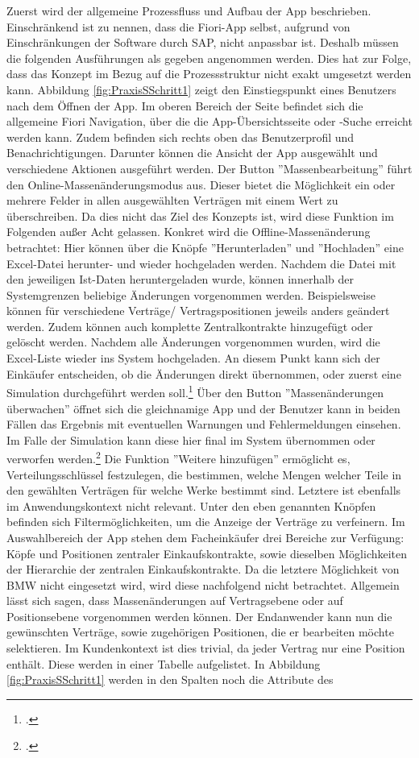Zuerst wird der allgemeine Prozessfluss und Aufbau der App beschrieben. Einschränkend ist zu nennen, dass die Fiori-App selbst, aufgrund von Einschränkungen der Software durch SAP, nicht anpassbar ist. Deshalb müssen die folgenden Ausführungen als gegeben angenommen werden. Dies hat zur Folge, dass das Konzept im Bezug auf die Prozessstruktur nicht exakt umgesetzt werden kann. Abbildung \ref{fig:PraxisSSchritt1} zeigt den Einstiegspunkt eines Benutzers nach dem Öffnen der App. Im oberen Bereich der Seite befindet sich die allgemeine Fiori Navigation, über die die App-Übersichtsseite oder -Suche erreicht werden kann. Zudem befinden sich rechts oben das Benutzerprofil und Benachrichtigungen. Darunter können die Ansicht der App ausgewählt und verschiedene Aktionen ausgeführt werden. Der Button ''Massenbearbeitung'' führt den Online-Massenänderungsmodus aus. Dieser bietet die Möglichkeit ein oder mehrere Felder in allen ausgewählten Verträgen mit einem Wert zu überschreiben. Da dies nicht das Ziel des Konzepts ist, wird diese Funktion im Folgenden au\ss er Acht gelassen. Konkret wird die Offline-Massenänderung betrachtet: Hier können über die Knöpfe ''Herunterladen'' und ''Hochladen'' eine Excel-Datei herunter- und wieder hochgeladen werden. Nachdem die Datei mit den jeweiligen Ist-Daten heruntergeladen wurde, können innerhalb der Systemgrenzen beliebige Änderungen vorgenommen werden. Beispielsweise können für verschiedene Verträge/ Vertragspositionen jeweils anders geändert werden. Zudem können auch komplette Zentralkontrakte hinzugefügt oder gelöscht werden. Nachdem alle Änderungen vorgenommen wurden, wird die Excel-Liste wieder ins System hochgeladen. An diesem Punkt kann sich der Einkäufer entscheiden, ob die Änderungen direkt übernommen, oder zuerst eine Simulation durchgeführt werden soll.\footcite[Vgl.][]{theorie_sap_fiori_make_mass_changes_2024} Über den Button ''Massenänderungen überwachen'' öffnet sich die gleichnamige App und der Benutzer kann in beiden Fällen das Ergebnis mit eventuellen Warnungen und Fehlermeldungen einsehen. Im Falle der Simulation kann diese hier final im System übernommen oder verworfen werden.\footcite[Vgl.][]{theorie_sap_fiori_monitor_mass_changes_2024} Die Funktion ''Weitere hinzufügen'' ermöglicht es, Verteilungsschlüssel festzulegen, die bestimmen, welche Mengen welcher Teile in den gewählten Verträgen für welche Werke bestimmt sind. Letztere ist ebenfalls im Anwendungskontext nicht relevant. Unter den eben genannten Knöpfen befinden sich Filtermöglichkeiten, um die Anzeige der Verträge zu verfeinern. Im Auswahlbereich der App stehen dem Facheinkäufer drei Bereiche zur Verfügung: Köpfe und Positionen zentraler Einkaufskontrakte, sowie dieselben Möglichkeiten der Hierarchie der zentralen Einkaufskontrakte. Da die letztere Möglichkeit von BMW nicht eingesetzt wird, wird diese nachfolgend nicht betrachtet. Allgemein lässt sich sagen, dass Massenänderungen auf Vertragsebene oder auf Positionsebene vorgenommen werden können. Der Endanwender kann nun die gewünschten Verträge, sowie zugehörigen Positionen, die er bearbeiten möchte selektieren. Im Kundenkontext ist dies trivial, da jeder Vertrag nur eine Position enthält. Diese werden in einer Tabelle aufgelistet. In Abbildung \ref{fig:PraxisSSchritt1} werden in den Spalten noch die Attribute des 